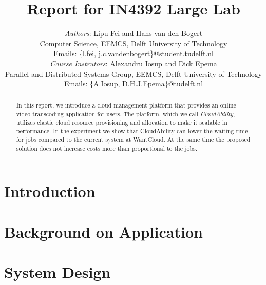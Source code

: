 \documentclass[10pt, a4paper, twoside, twocolumn, technote]{IEEEtran}
\begin{document}
\newcommand{\staterunning}{
  \textsc{running}
}
\newcommand{\statepending}{
  \textsc{pending}
}

\newcommand{\statefinished}{
  \textsc{finished}
}
\newcommand{\statefailed}{
  \textsc{failed}
}

\newcommand{\policystatic}{
  \textsc{static}
}
\newcommand{\policysimpleelastic}{
  \textsc{simple elastic}
}


\title{Report for IN4392 Large Lab}
\author{\textit{Authors}: Lipu Fei and Hans van den Bogert\\
  Computer Science, EEMCS, Delft University of Technology\\
  Emails: \{l.fei, j.c.vandenbogert\}@student.tudelft.nl\\
  \textit{Course Instrutors}: Alexandru Iosup and Dick Epema\\
  Parallel and Distributed Systems Group, EEMCS, Delft University of Technology\\
  Emails: \{A.Iosup, D.H.J.Epema\}@tudelft.nl}

\maketitle

\begin{abstract}
  In this report, we introduce a cloud management platform that
  provides an online video-transcoding application for users. The
  platform, which we call \emph{CloudAbility}, utilizes elastic cloud
  resource provisioning and allocation to make it scalable in
  performance. In the experiment we show that CloudAbility can lower
  the waiting time for jobs compared to the current system at
  WantCloud. At the same time the proposed solution does not increase
  costs more than proportional to the jobs.
\end{abstract}

\section{Introduction}


\section{Background on Application}\label{background}


\section{System Design}\label{design}

\end{document}
